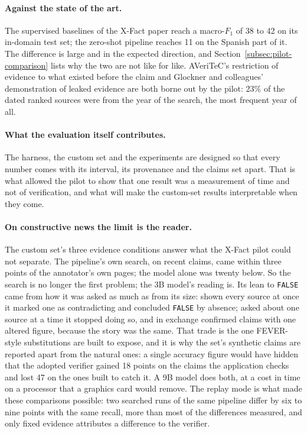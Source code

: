 \paragraph{Against the state of the art.} The supervised baselines of
the X-Fact paper reach a macro-$F_1$ of 38 to 42 on its in-domain test
set; the zero-shot pipeline reaches 11 on the Spanish part of it. The
difference is large and in the expected direction, and
Section~\ref{subsec:pilot-comparison} lists why the two are not like
for like. AVeriTeC's restriction of evidence to what existed before the
claim \cite{schlichtkrull2023averitec} and Glockner and colleagues'
demonstration of leaked evidence \cite{glockner2022missing} are both
borne out by the pilot: 23\% of the dated ranked sources were from the
year of the search, the most frequent year of all.

\paragraph{What the evaluation itself contributes.} The harness, the
custom set and the experiments are designed so that every number comes
with its interval, its provenance and the claims set apart. That is
what allowed the pilot to show that one result was a measurement of
time and not of verification, and what will make the custom-set
results interpretable when they come.

\paragraph{On constructive news the limit is the reader.} The custom
set's three evidence conditions answer what the X-Fact pilot could not
separate. The pipeline's own search, on recent claims, came within
three points of the annotator's own pages; the model alone was twenty
below. So the search is no longer the first problem; the 3B model's
reading is. Its lean to \texttt{FALSE} came from how it was asked as
much as from its size: shown every source at once it marked one as
contradicting and concluded \texttt{FALSE} by absence; asked about one
source at a time it stopped doing so, and in exchange confirmed claims
with one altered figure, because the story was the same. That trade is
the one FEVER-style substitutions are built to expose, and it is why
the set's synthetic claims are reported apart from the natural ones: a
single accuracy figure would have hidden that the adopted verifier
gained 18 points on the claims the application checks and lost 47 on
the ones built to catch it. A 9B model does both, at a cost in time on a
processor that a graphics card would remove. The replay mode is what
made these comparisons possible: two searched runs of the same pipeline
differ by six to nine points with the same recall, more than most of
the differences measured, and only fixed evidence attributes a
difference to the verifier.
